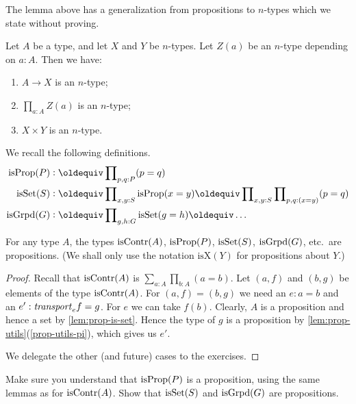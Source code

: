 The lemma above has a generalization from propositions to
$n$-types which we state without proving.

\begin{lemma}\label{lem:level-n-utils}
Let $A$ be a type, and let $X$ and $Y$ be $n$-types.
Let $Z(a)$ be an $n$-type depending on $a:A$. Then we have:

\begin{enumerate}
\item\label{level-n-utils-implication} $A\to X$ is an $n$-type;
\item\label{level-n-utils-pi} $\prod_{a:A} Z(a)$ is an $n$-type;
\item\label{level-n-utils-times} $X\times Y$ is an $n$-type.
\end{enumerate}
\end{lemma}

We recall the following definitions.
\begin{align*}
\isprop(P) &\defeq\prod\nolimits_{p,q:P}(p=q)\\
\isset(S) &\defeq\prod\nolimits_{x,y:S}\isprop(x=y)\jdeq
                  \prod\nolimits_{x,y:S}\prod\nolimits_{p,q:(x=y)}(p=q)\\
\isgrpd(G) &\defeq\prod\nolimits_{g,h:G}\isset(g=h)\jdeq \ldots\\
\end{align*}

\begin{lemma}\label{lem:isX-is-prop}
  For any type $A$, the types 
$\mathrm{isContr}(A)$, $\mathrm{isProp}(P)$, $\mathrm{isSet}(S)$, $\mathrm{isGrpd}(G)$, etc.\ are propositions.
(We shall only use the notation $\mathrm{isX}(Y)$ for propositions about $Y$.)
\end{lemma}

\begin{proof}
Recall that $\mathrm{isContr}(A)$ is $\sum_{a:A} \prod_{b:A} (a=b)$.
Let $(a,f)$ and $(b,g)$ be elements of the type $\mathrm{isContr}(A)$.
For $(a,f) = (b,g)$ we need an $e : a=b$ and an $e' : \mathord{\mathit{transport}}_e f = g$.
For $e$ we can take $f(b)$. Clearly, $A$ is a proposition and hence
a set by \cref{lem:prop-is-set}. Hence the type of $g$ is a proposition
by \cref{lem:prop-utils}(\ref{prop-utils-pi}), which gives us $e'$.

We delegate the other (and future) cases to the exercises.
\end{proof}

\begin{xca}\label{xca:isX-is-prop}
Make sure you understand that $\mathrm{isProp}(P)$ is a proposition,
using the same lemmas as for $\mathrm{isContr}(A)$.
Show that $\mathrm{isSet}(S)$ and $\mathrm{isGrpd}(G)$ are propositions.
\end{xca}

